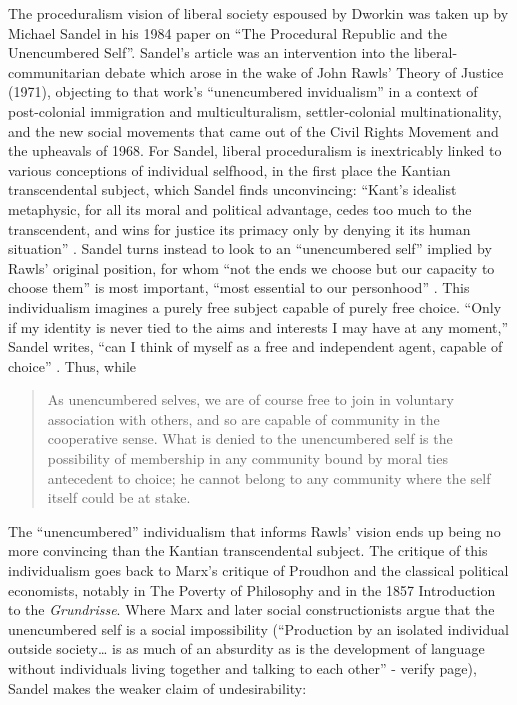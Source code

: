 \documentclass[12pt,oneside]{memoir}
\begin{document}
The proceduralism vision of liberal society espoused by Dworkin was taken up by Michael Sandel in his 1984 paper on ``The Procedural Republic and the Unencumbered Self''. Sandel's article was an intervention into the liberal-communitarian debate which arose in the wake of John Rawls' Theory of Justice (1971), objecting to that work's ``unencumbered invidualism'' in a context of post-colonial immigration and multiculturalism, settler-colonial multinationality, and the new social movements that came out of the Civil Rights Movement and the upheavals of 1968. For Sandel, liberal proceduralism is inextricably linked to various conceptions of individual selfhood, in the first place the Kantian transcendental subject, which Sandel finds unconvincing: ``Kant's idealist metaphysic, for all its moral and political advantage, cedes too much to the transcendent, and wins for justice its primacy only by denying it its human situation'' \citep[85]{Sandel1984}. Sandel turns instead to look to an ``unencumbered self'' implied by Rawls' original position, for whom ``not the ends we choose but our capacity to choose them'' is most important, ``most essential to our personhood'' \citep[86]{Sandel1984}. This individualism imagines a purely free subject capable of purely free choice. ``Only if my identity is never tied to the aims and interests I may have at any moment,'' Sandel writes, ``can I think of myself as a free and independent agent, capable of choice'' \citep[86]{Sandel1984}. Thus, while

\begin{quote}

As unencumbered selves, we are of course free to join in voluntary association with others, and so are capable of community in the cooperative sense. What is denied to the unencumbered self is the possibility of membership in any community bound by moral ties antecedent to choice; he cannot belong to any community where the self itself could be at stake. \cite[86-87]{Sandel1984}

\end{quote}

The ``unencumbered'' individualism that informs Rawls' vision ends up being no more convincing than the Kantian transcendental subject. The critique of this individualism goes back to Marx's critique of Proudhon and the classical political economists, notably in The Poverty of Philosophy and in the 1857 Introduction to the \emph{Grundrisse}. Where Marx and later social constructionists argue that the unencumbered self is a social impossibility (``Production by an isolated individual outside society{\ldots} is as much of an absurdity as is the development of language without individuals living together and talking to each other'' \cite[17]{Marx1973} - verify page), Sandel makes the weaker claim of undesirability:
\end{document}
